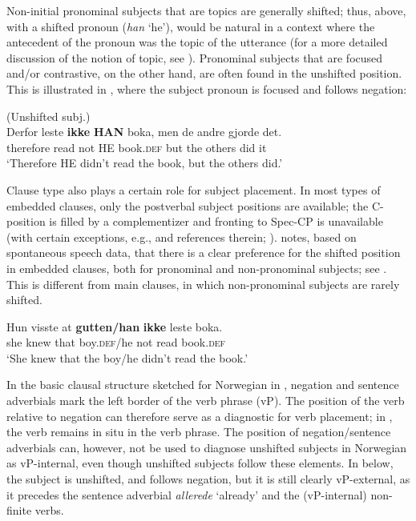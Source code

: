\documentclass[output=paper]{langscibook}
\begin{document}
Non-initial pronominal subjects that are topics are generally shifted; thus,  above, with a shifted pronoun (\textit{han} ‘he’), would be natural in a context where the antecedent of the pronoun was the topic of the utterance (for a more detailed discussion of the notion of topic, see ). Pronominal subjects that are focused and/or contrastive, on the other hand, are often found in the unshifted position. This is illustrated in , where the subject pronoun is focused and follows negation:

\ea (Unshifted subj.)\label{ex:larsson:7}\\
\gll Derfor leste \textbf{ikke} \textbf{HAN} boka, men de andre gjorde det.\\
	 therefore read not HE book.\textsc{def} but the others did it\\
\glt ‘Therefore HE didn’t read the book, but the others did.’
\z

Clause type also plays a certain role for subject placement. In most types of embedded clauses, only the postverbal subject positions are available; the C-position is filled by a complementizer and fronting to Spec-CP is unavailable (with certain exceptions, e.g., \citealt{Julien2015,Julien2020} and references therein; \citealt{Ringstad2019}). \citet{Westergaard2011} notes, based on spontaneous speech data, that there is a clear preference for the shifted position in embedded clauses, both for pronominal and non-pronominal subjects; see . This is different from main clauses, in which non-pronominal subjects are rarely shifted. 

\ea \label{ex:larsson:8}
\gll Hun visste at \textbf{gutten/han} \textbf{ikke} leste boka.\\
     she knew that boy.\textsc{def}/he not read book.\textsc{def}\\
\glt ‘She knew that the boy/he didn’t read the book.’
\z

In the basic clausal structure sketched for Norwegian in , negation and sentence adverbials mark the left border of the verb phrase (vP). The position of the verb relative to negation can therefore serve as a diagnostic for verb placement; in , the verb remains in situ in the verb phrase. The position of negation/sentence adverbials can, however, not be used to diagnose unshifted subjects in Norwegian as vP-internal, even though unshifted subjects follow these elements. In  below, the subject is unshifted, and follows negation, but it is still clearly vP-external, as it precedes the sentence adverbial \textit{allerede} ‘already’ and the (vP-internal) non-finite verbs. 
\end{document}
